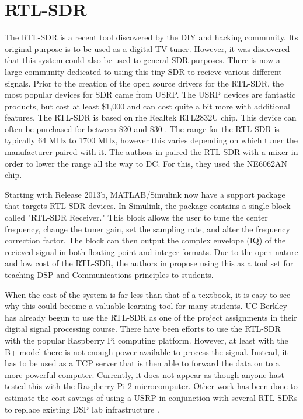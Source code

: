 \section{RTL-SDR}

	The RTL-SDR is a recent tool discovered by the DIY and hacking community. Its original purpose is to be used as a digital
	TV tuner. However, it was discovered that this system could also be used to general SDR purposes. There is now a large 
	community dedicated to using this tiny SDR to recieve various different signals. Prior to the creation of the open source
	drivers for the RTL-SDR, the most popular devices for SDR came from USRP. The USRP devices are fantastic products, but cost
	at least \$1,000 and can cost quite a bit more with additional features. The RTL-SDR is based on rhe Realtek RTL2832U chip.
	This device can often be purchased for between \$20 and \$30 \cite{6526525}. The range for the RTL-SDR is typically 64 MHz
	to 1700 MHz, however this varies depending on which tuner the manufacturer paired with it. The authors in \cite{6526525} 
	paired the RTL-SDR with a mixer in order to lower the range all the way to DC. For this, they used the NE6062AN chip.  
	
	Starting with Release 2013b, MATLAB/Simulink now have a support package that targets RTL-SDR devices. In Simulink, the
	package contains a single block called "RTL-SDR Receiver." This block allows the user to tune the center frequency, 
	change the tuner gain, set the sampling rate, and alter the frequency correction factor. The block can then output
	the complex envelope (IQ) of the recieved signal in both floating point and integer formats\cite{6893337}.  Due to 
	the open nature and low cost of the RTL-SDR, the authors in \cite{6821718} propose using this as a tool set for
	teaching DSP and Communications principles to students. 
	
	When the cost of the system is far less than that of a
	textbook, it is easy to see why this could become a valuable learning tool for many students. UC Berkley has 	
	already begun to use the RTL-SDR as one of the project assignments in their digital signal processing course. 
	There have been efforts to use the RTL-SDR with the popular Raspberry Pi computing platform. However, at least
	with the B+ model there is not enough power available to process the signal. Instead, it has to be used as a TCP
	server that is then able to forward the data on to a more powerful computer\cite{6938691}. Currently, it does not
	appear as though anyone hast tested this with the Raspberry Pi 2 microcomputer. Other work has been done to
	estimate the cost savings of using a USRP in conjunction with several RTL-SDRs to replace existing DSP lab infrastructure
	\cite{6726630}. 
	

